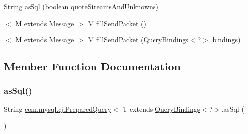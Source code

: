 \begin{DoxyCompactItemize}
\item 
String \mbox{\hyperlink{interfacecom_1_1mysql_1_1cj_1_1_prepared_query_a9e0ad2ee67b2f5622e8c2498261dda22}{as\+Sql}} (boolean quote\+Streams\+And\+Unknowns)
\item 
$<$ M extends \mbox{\hyperlink{interfacecom_1_1mysql_1_1cj_1_1protocol_1_1_message}{Message}} $>$ M \mbox{\hyperlink{interfacecom_1_1mysql_1_1cj_1_1_prepared_query_aa466e879cf875af6ddbd571940192eac}{fill\+Send\+Packet}} ()
\item 
$<$ M extends \mbox{\hyperlink{interfacecom_1_1mysql_1_1cj_1_1protocol_1_1_message}{Message}} $>$ M \mbox{\hyperlink{interfacecom_1_1mysql_1_1cj_1_1_prepared_query_aab23700381df4cf13e7f1801ff0024c2}{fill\+Send\+Packet}} (\mbox{\hyperlink{interfacecom_1_1mysql_1_1cj_1_1_query_bindings}{Query\+Bindings}}$<$?$>$ bindings)
\end{DoxyCompactItemize}


\subsection{Member Function Documentation}
\mbox{\label{interfacecom_1_1mysql_1_1cj_1_1_prepared_query_ac2538d056fb63b9b41286a424bb712c1}} 
\subsubsection{\texorpdfstring{as\+Sql()}{asSql()}\hspace{0.1cm}{\footnotesize\ttfamily [1/2]}}
{\footnotesize\ttfamily String \mbox{\hyperlink{interfacecom_1_1mysql_1_1cj_1_1_prepared_query}{com.\+mysql.\+cj.\+Prepared\+Query}}$<$ T extends \mbox{\hyperlink{interfacecom_1_1mysql_1_1cj_1_1_query_bindings}{Query\+Bindings}}$<$?$>$.as\+Sql (\begin{DoxyParamCaption}{ }\end{DoxyParamCaption})}

\mbox{\label{interfacecom_1_1mysql_1_1cj_1_1_prepared_query_a9e0ad2ee67b2f5622e8c2498261dda22}} 
